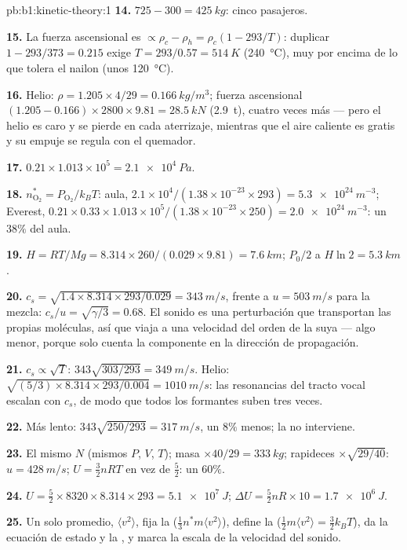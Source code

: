 \begin{solution}{pb:b1:kinetic-theory:1}
\textbf{14.} $725 - 300 = \qty{425}{kg}$: cinco pasajeros.

\textbf{15.} La fuerza ascensional es $\propto \rho_c - \rho_h = \rho_c(1 - 293/T)$:
duplicar $1 - 293/373 = 0.215$ exige $T = 293/0.57 = \qty{514}{K}$ (\qty{240}{\degreeCelsius}),
muy por encima de lo que tolera el nailon (unos \qty{120}{\degreeCelsius}).

\textbf{16.} Helio: $\rho = 1.205 \times 4/29 = \qty{0.166}{kg/m^3}$; fuerza
ascensional $(1.205 - 0.166) \times 2800 \times 9.81 = \qty{28.5}{kN}$ (\qty{2.9}{t}),
cuatro veces más --- pero el helio es caro y se pierde en cada aterrizaje,
mientras que el aire caliente es gratis y su empuje se regula con el quemador.

\textbf{17.} $0.21 \times 1.013\times10^5 = \qty{2.1e4}{Pa}$.

\textbf{18.} $n^*_{\mathrm{O}_2} = P_{\mathrm{O}_2}/k_BT$: aula, $2.1\times10^4/
(1.38\times10^{-23} \times 293) = \qty{5.3e24}{m^{-3}}$; Everest, $0.21 \times 0.33
\times 1.013\times10^5/(1.38\times10^{-23} \times 250) = \qty{2.0e24}{m^{-3}}$:
un $38\%$ del aula.

\textbf{19.} $H = RT/Mg = 8.314 \times 260/(0.029 \times 9.81) = \qty{7.6}{km}$;
$P_0/2$ a $H\ln 2 = \qty{5.3}{km}$.

\textbf{20.} $c_s = \sqrt{1.4 \times 8.314 \times 293/0.029} = \qty{343}{m/s}$,
frente a $u = \qty{503}{m/s}$ para la mezcla: $c_s/u = \sqrt{\gamma/3} = 0.68$.
El sonido es una perturbación que transportan las propias moléculas, así
que viaja a una velocidad del orden de la suya --- algo menor, porque solo
cuenta la componente en la dirección de propagación.

\textbf{21.} $c_s \propto \sqrt T$: $343\sqrt{303/293} = \qty{349}{m/s}$.
Helio: $\sqrt{(5/3) \times 8.314 \times 293/0.004} = \qty{1010}{m/s}$: las
resonancias del tracto vocal escalan con $c_s$, de modo que todos los
formantes suben tres veces.

\textbf{22.} Más lento: $343\sqrt{250/293} = \qty{317}{m/s}$, un $8\%$ menos;
la  no interviene.

\textbf{23.} El mismo $N$ (mismos $P$, $V$, $T$); masa $\times 40/29 = \qty{333}{kg}$;
rapideces $\times\sqrt{29/40}$: $u = \qty{428}{m/s}$; $U = \tfrac32 nRT$ en vez de
$\tfrac52$: un $60\%$.

\textbf{24.} $U = \tfrac52 \times 8320 \times 8.314 \times 293 = \qty{5.1e7}{J}$;
$\Delta U = \tfrac52 nR \times 10 = \qty{1.7e6}{J}$.

\textbf{25.} Un solo promedio, $\langle v^2\rangle$, fija la 
($\tfrac13 n^*m\langle v^2\rangle$), define la 
($\tfrac12 m\langle v^2\rangle = \tfrac32 k_BT$), da la ecuación de estado y
la , y marca la escala de la velocidad del sonido.
\end{solution}
